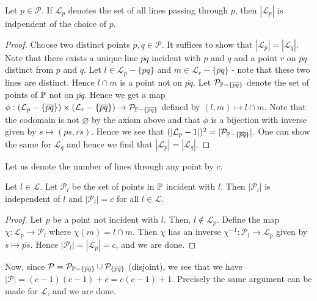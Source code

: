 \documentclass{../../mathnotes}
\begin{document}
\begin{lem}
    Let $p\in\mathcal{P}$. If $\mathcal{L}_p$ denotes the set of all lines passing through $p$, then $|\mathcal{L}_p|$ is indpendent
    of the choice of $p$.
\end{lem}
\begin{proof}
    Choose two distinct points $p,q\in\mathcal{P}$. It suffices to show that $|\mathcal{L}_p|=|\mathcal{L}_q|$. Note that there exists a
    unique line $\overline{pq}$ incident with $p$ and $q$ and a point $r$ on $\overline{pq}$ distinct from $p$ and $q$. Let $l\in\mathcal{L}_p-\{\overline{pq}\}$
    and $m\in\mathcal{L}_r-\{\overline{pq}\}$ - note that these two lines are distinct. Hence $l\cap m$ is a point not on $\overline{pq}$. Let $\mathcal{P}_{\mathbb{P}-\{\overline{pq}\}}$
    denote the set of points of $\mathbb{P}$ not on $\overline{pq}$. Hence we get a map
    $\phi:\left( \mathcal{L}_p-\{\overline{pq}\} \right)\times\left( \mathcal{L}_r-\{\overline{pq}\} \right)\to\mathcal{P}_{\mathbb{P}-\{\overline{pq}\}}$ defined by
    $(l,m)\mapsto l\cap m$. Note that the codomain is not $\varnothing$ by the axiom above and that $\phi$ is a bijection with inverse given by $s\mapsto (\overline{ps},\overline{rs})$.
    Hence we see that $(|\mathcal{L}_p-1|)^2=|\mathcal{P}_{\mathbb{P}-\{\overline{pq}\}}|$. One can show the same for $\mathcal{L}_q$ and hence we find that $|\mathcal{L}_p|=|\mathcal{L}_q|$.
\end{proof}

Let us denote the number of lines through any point by $c$.

\begin{lem}
    Let $l\in\mathcal{L}$. Let $\mathcal{P}_l$ be the set of points in $\mathbb{P}$ incident with $l$. Then $|\mathcal{P}_l|$ is independent of $l$ and $|\mathcal{P}_l|=c$ for all $l\in\mathcal{L}$.
\end{lem}
\begin{proof}
    Let $p$ be a point not incident with $l$. Then, $l\notin \mathcal{L}_p$. Define the map $\chi:\mathcal{L}_p\to\mathcal{P}_l$ where $\chi(m)=l\cap m$.
    Then $\chi$ has an inverse $\chi^{-1}:\mathcal{P}_l\to\mathcal{L}_p$ given by $s\mapsto \overline{ps}$. Hence $|\mathcal{P}_l|=|\mathcal{L}_p|=c$,
    and we are done.
\end{proof}

Now, since $\mathcal{P}=\mathcal{P}_{\mathbb{P}-\{\overline{pq}\}}\cup \mathcal{P}_{\{\overline{pq}\}}$ (disjoint), we see that we have $|\mathcal{P}|=(c-1)(c-1)+c=c(c-1)+1$.
Precisely the same argument can be made for $\mathcal{L}$, and we are done.
\end{document}
